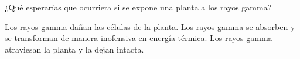 ¿Qué esperarías que ocurriera si se expone una planta a los rayos
gamma?

\begin{choices}
    \CorrectChoice Los rayos gamma dañan las células de la planta.
    \choice Los rayos gamma se absorben y se transforman de manera
    inofensiva en energía térmica.
    \choice Los rayos gamma atraviesan la planta y la dejan intacta.
\end{choices}
